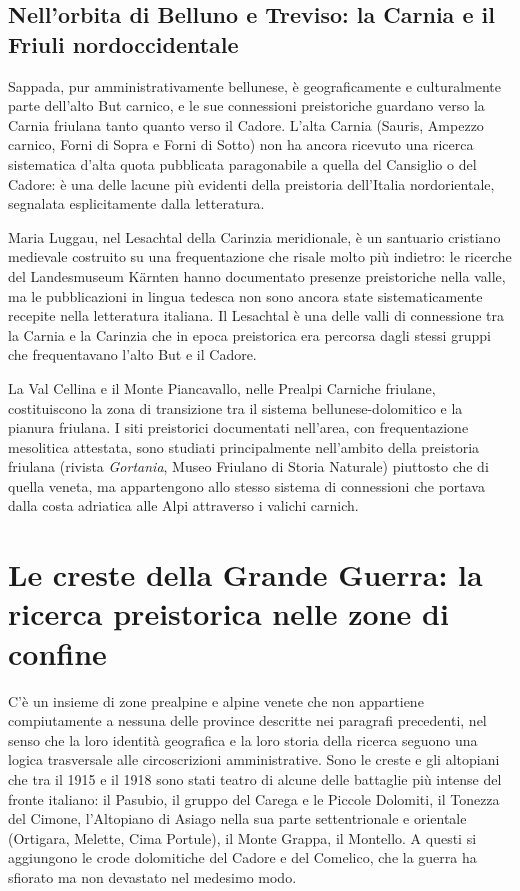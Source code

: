 \subsection{Nell'orbita di Belluno e Treviso: la Carnia e il Friuli nordoccidentale}

Sappada, pur amministrativamente bellunese, è geograficamente e culturalmente parte dell'alto But carnico, e le sue connessioni preistoriche guardano verso la Carnia friulana tanto quanto verso il Cadore. L'alta Carnia (Sauris, Ampezzo carnico, Forni di Sopra e Forni di Sotto) non ha ancora ricevuto una ricerca sistematica d'alta quota pubblicata paragonabile a quella del Cansiglio o del Cadore: è una delle lacune più evidenti della preistoria dell'Italia nordorientale, segnalata esplicitamente dalla letteratura.

Maria Luggau, nel Lesachtal della Carinzia meridionale, è un santuario cristiano medievale costruito su una frequentazione che risale molto più indietro: le ricerche del Landesmuseum Kärnten hanno documentato presenze preistoriche nella valle, ma le pubblicazioni in lingua tedesca non sono ancora state sistematicamente recepite nella letteratura italiana. Il Lesachtal è una delle valli di connessione tra la Carnia e la Carinzia che in epoca preistorica era percorsa dagli stessi gruppi che frequentavano l'alto But e il Cadore.

La Val Cellina e il Monte Piancavallo, nelle Prealpi Carniche friulane, costituiscono la zona di transizione tra il sistema bellunese-dolomitico e la pianura friulana. I siti preistorici documentati nell'area, con frequentazione mesolitica attestata, sono studiati principalmente nell'ambito della preistoria friulana (rivista \emph{Gortania}, Museo Friulano di Storia Naturale) piuttosto che di quella veneta, ma appartengono allo stesso sistema di connessioni che portava dalla costa adriatica alle Alpi attraverso i valichi carnich.

\section{Le creste della Grande Guerra: la ricerca preistorica nelle zone di confine}

C'è un insieme di zone prealpine e alpine venete che non appartiene compiutamente a nessuna delle province descritte nei paragrafi precedenti, nel senso che la loro identità geografica e la loro storia della ricerca seguono una logica trasversale alle circoscrizioni amministrative. Sono le creste e gli altopiani che tra il 1915 e il 1918 sono stati teatro di alcune delle battaglie più intense del fronte italiano: il Pasubio, il gruppo del Carega e le Piccole Dolomiti, il Tonezza del Cimone, l'Altopiano di Asiago nella sua parte settentrionale e orientale (Ortigara, Melette, Cima Portule), il Monte Grappa, il Montello. A questi si aggiungono le crode dolomitiche del Cadore e del Comelico, che la guerra ha sfiorato ma non devastato nel medesimo modo.

